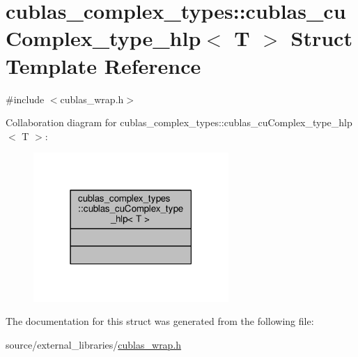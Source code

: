 \hypertarget{structcublas__complex__types_1_1cublas__cuComplex__type__hlp}{\section{cublas\-\_\-complex\-\_\-types\-:\-:cublas\-\_\-cu\-Complex\-\_\-type\-\_\-hlp$<$ T $>$ Struct Template Reference}
\label{structcublas__complex__types_1_1cublas__cuComplex__type__hlp}
}


{\ttfamily \#include $<$cublas\-\_\-wrap.\-h$>$}



Collaboration diagram for cublas\-\_\-complex\-\_\-types\-:\-:cublas\-\_\-cu\-Complex\-\_\-type\-\_\-hlp$<$ T $>$\-:
\nopagebreak
\begin{figure}[H]
\begin{center}
\leavevmode
\includegraphics[width=210pt]{structcublas__complex__types_1_1cublas__cuComplex__type__hlp__coll__graph}
\end{center}
\end{figure}


The documentation for this struct was generated from the following file\-:\begin{DoxyCompactItemize}
\item 
source/external\-\_\-libraries/\hyperlink{cublas__wrap_8h}{cublas\-\_\-wrap.\-h}\end{DoxyCompactItemize}
